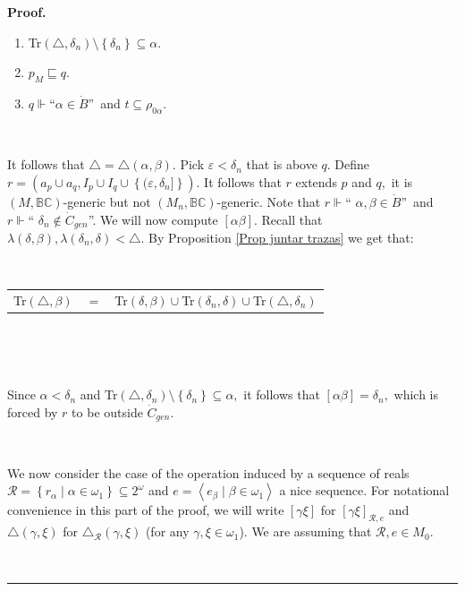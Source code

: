 \documentclass{article}
\newenvironment{proof}[1][Proof]{\noindent\textbf{#1.} }{\ \rule{0.5em}{0.5em}}
\begin{document}
\begin{proof}
\begin{enumerate}
\item \textsf{Tr}$(\triangle,\delta_{n})\setminus\left\{  \delta_{n}\right\}
\subseteq\alpha.$

\item $p_{M}\sqsubseteq q.$

\item $q\Vdash$\textquotedblleft$\alpha\in\dot{B}$\textquotedblright\ and
$t\subseteq\rho_{0\alpha}.$
\end{enumerate}

\qquad\ \ \qquad\ \ \ \qquad\ \ 

It follows that $\triangle=\triangle\left(  \alpha,\beta\right)  .$ Pick
$\varepsilon<\delta_{n}$ that is above $q.$ Define $r=\left(  a_{p}\cup
a_{q},I_{p}\cup I_{q}\cup\left\{  (\varepsilon,\delta_{n}]\right\}  \right)
.$ It follows that $r$ extends $p$ and $q,$ it is $(M,\mathbb{BC})$-generic
but not $(M_{n},\mathbb{BC})$-generic. Note that $r\Vdash$\textquotedblleft%
$\alpha,\beta\in\dot{B}$\textquotedblright\ and $r\Vdash$\textquotedblleft%
$\delta_{n}\notin\dot{C}_{gen}$\textquotedblright. We will now compute
$\left[  \alpha\beta\right]  .$ Recall that $\lambda\left(  \delta
,\beta\right)  ,\lambda\left(  \delta_{n},\delta\right)  <\triangle.$ By
Proposition \ref{Prop juntar trazas} we get that:

\qquad\qquad\qquad\ \ \ \ \ \ \qquad\ \ \ 

\hfill%
\begin{tabular}
[c]{ccc}%
\textsf{Tr}$(\triangle,\beta)$ & $=$ & \textsf{Tr}$(\delta,\beta)\cup
$\textsf{Tr}$(\delta_{n},\delta)\cup$\textsf{Tr}$(\triangle,\delta_{n})$%
\end{tabular}
\hfill\ 

\ \ \ \qquad\ \ \ \ \qquad\ \ \ \ \qquad\qquad\ \ \ \ 

Since $\alpha<\delta_{n}$ and \textsf{Tr}$(\triangle,\delta_{n})\setminus
\left\{  \delta_{n}\right\}  \subseteq\alpha,$ it follows that $\left[
\alpha\beta\right]  =\delta_{n},$ which is forced by $r$ to be outside
$\dot{C}_{gen}.$

\qquad\ \ \qquad\ \ \ 

We now consider the case of the operation induced by a sequence of reals
$\mathcal{R}=\left\{  r_{\alpha}\mid\alpha\in\omega_{1}\right\}
\subseteq2^{\omega}$ and $e=\left\langle e_{\beta}\mid\beta\in\omega
_{1}\right\rangle $ a nice sequence. For notational convenience in this part
of the proof, we will write $\left[  \gamma\xi\right]  $ for $\left[
\gamma\xi\right]  _{\mathcal{R},e}$ and $\triangle\left(  \gamma,\xi\right)  $
for $\triangle_{\mathcal{R}}\left(  \gamma,\xi\right)  $ (for any $\gamma
,\xi\in\omega_{1}$). We are assuming that $\mathcal{R},e\in M_{0}.$


\end{proof}
\end{document}
